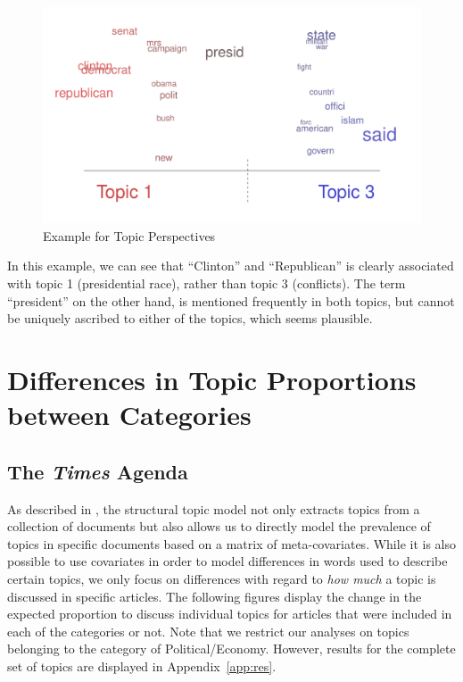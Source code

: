 \documentclass[12pt]{article}
\begin{document}
\begin{doublespace}
\begin{figure}
\caption{Example for Topic Perspectives}\label{fig:perspectives}
\includegraphics[width=\textwidth]{../calc/fig/perspective}
\end{figure}

In this example, we can see that ``Clinton'' and ``Republican'' is clearly associated with topic 1 (presidential race), rather than topic 3 (conflicts). The term ``president'' on the other hand, is mentioned frequently in both topics, but cannot be uniquely ascribed to either of the topics, which seems plausible.


\section{Differences in Topic Proportions between Categories}
\subsection{The \textit{Times} Agenda}
As described in \citet{roberts2014structural}, the structural topic model not only extracts topics from a collection of documents but also allows us to directly model the prevalence of topics in specific documents based on a matrix of meta-covariates. While it is also possible to use covariates in order to model differences in words used to describe certain topics, we only focus on differences with regard to \textit{how much} a topic is discussed in specific articles. The following figures display the change in the expected proportion to discuss individual topics for articles that were included in each of the categories or not. Note that we restrict our analyses on topics belonging to the category of Political/Economy. However, results for the complete set of topics are displayed in Appendix~\ref{app:res}.


\end{doublespace}
\end{document}
